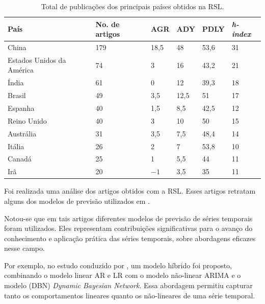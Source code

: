 \begin{table}[!htb]
	\centering
	\caption{Total de publicações dos principais países obtidos na RSL.}\label{tb:pais}
	\begin{tabular}{llllll}
		\toprule
		País & No. de artigos & AGR & ADY & PDLY & \textit{h-index} \\
		\midrule
		China & 179 & 18,5 & 48 & 53,6 & 31 \\
		Estados Unidos da América & 74 & 3 & 16 & 43,2 & 21 \\
		Índia & 61 & 0 & 12 & 39,3 & 18 \\
		Brasil & 49 & 3,5 & 12,5 & 51 & 17 \\
		Espanha & 40 & 1,5 & 8,5 & 42,5 & 12 \\
		Reino Unido & 40 & 3 & 10 & 50 & 15 \\
		Austrália & 31 & 3,5 & 7,5 & 48,4 & 14 \\
		Itália & 26 & 2 & 7 & 53,8 & 10 \\
		Canadá & 25 & 1 & 5,5 & 44 & 11 \\
		Irã & 20 & $-1$ & 3,5 & 35 & 11 \\
		\bottomrule
	\end{tabular}
\end{table}



Foi realizada uma análise dos artigos obtidos com a RSL. Esses artigos retratam alguns dos modelos de previsão utilizados em 
.

Notou-se que em tais artigos diferentes modelos de previsão de séries temporais foram utilizados. Eles representam contribuições significativas para o avanço do conhecimento e aplicação prática das séries temporais, sobre abordagens eficazes nesse campo. 

Por exemplo, no estudo conduzido por , um modelo híbrido foi proposto, combinando o modelo linear AR e LR com o modelo não-linear ARIMA e o modelo (DBN) \textit{Dynamic Bayesian Network}. Essa abordagem permitiu capturar tanto os comportamentos lineares quanto os não-lineares de uma série temporal. 

